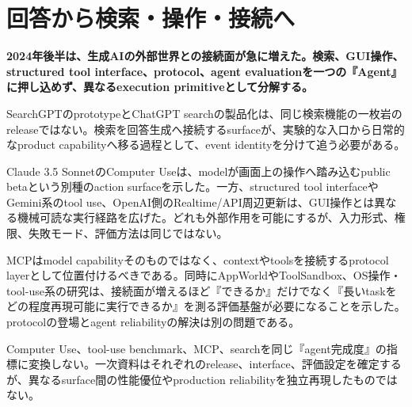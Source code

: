 \section{回答から検索・操作・接続へ}
\noindent\textbf{2024年後半は、生成AIの外部世界との接続面が急に増えた。検索、GUI操作、structured tool interface、protocol、agent evaluationを一つの『Agent』に押し込めず、異なるexecution primitiveとして分解する。}\autocite{src-6cafd8cf5668,src-9e4ef9c155b6}

SearchGPTのprototypeとChatGPT searchの製品化は、同じ検索機能の一枚岩のreleaseではない。検索を回答生成へ接続するsurfaceが、実験的な入口から日常的なproduct capabilityへ移る過程として、event identityを分けて追う必要がある。\autocite{src-6cafd8cf5668,src-bd5105ccfa25}


Claude 3.5 SonnetのComputer Useは、modelが画面上の操作へ踏み込むpublic betaという別種のaction surfaceを示した。一方、structured tool interfaceやGemini系のtool use、OpenAI側のRealtime/API周辺更新は、GUI操作とは異なる機械可読な実行経路を広げた。どれも外部作用を可能にするが、入力形式、権限、失敗モード、評価方法は同じではない。\autocite{src-9e4ef9c155b6,src-a38408fd5407,src-e283b9c34207,src-ed98251ab05d}


MCPはmodel capabilityそのものではなく、contextやtoolsを接続するprotocol layerとして位置付けるべきである。同時にAppWorldやToolSandbox、OS操作・tool-use系の研究は、接続面が増えるほど『できるか』だけでなく『長いtaskをどの程度再現可能に実行できるか』を測る評価基盤が必要になることを示した。protocolの登場とagent reliabilityの解決は別の問題である。\autocite{src-0d67af76cfef,src-395ebe20f9b0,src-5ad3266ea448,src-7afacff558f5}


\begin{claimboundary}
Computer Use、tool-use benchmark、MCP、searchを同じ『agent完成度』の指標に変換しない。一次資料はそれぞれのrelease、interface、評価設定を確定するが、異なるsurface間の性能優位やproduction reliabilityを独立再現したものではない。\autocite{src-9e4ef9c155b6}
\end{claimboundary}

